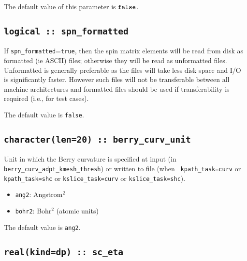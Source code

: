 The default value of this parameter is $\verb#false#$.




\subsection[spn\_formatted]{\tt logical :: spn\_formatted}

If \verb#spn_formatted#=\verb#true#, then the spin matrix elements
will be read from disk as formatted (ie ASCII) files; otherwise they
will be read as unformatted files. Unformatted is generally preferable
as the files will take less disk space and I/O is significantly
faster. However such files will not be transferable between all
machine architectures and formatted files should be used if
transferability is required (i.e., for test cases).

The default value is \verb#false#.


\subsection[spn\_formatted]{\tt character(len=20) :: berry\_curv\_unit}

Unit in which the Berry curvature is specified at input (in {\tt
  berry\_curv\_adpt\_kmesh\_thresh}) or written to file (when {\tt
  kpath\_task=curv} or {\tt
  kpath\_task=shc} or {\tt kslice\_task=curv} or {\tt kslice\_task=shc}).

\begin{itemize}

\item
  {\tt ang2}: Angstrom$^2$

\item
  {\tt bohr2}: Bohr$^2$ (atomic units)

\end{itemize}

The default value is {\tt ang2}.


\subsection{\tt real(kind=dp) :: sc\_eta}

